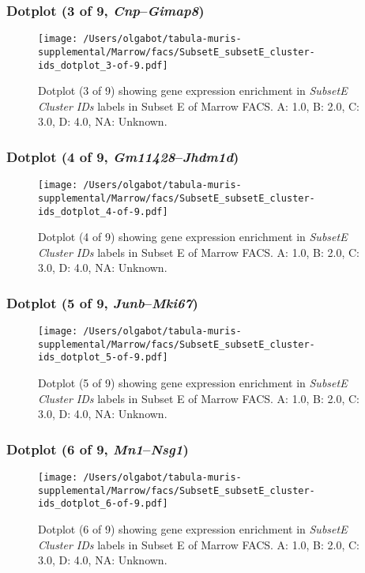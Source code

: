 \clearpage

\subsubsection{Dotplot (3 of 9, \emph{Cnp}--\emph{Gimap8})}
\begin{figure}[h]
\centering
\texttt{[image: /Users/olgabot/tabula-muris-supplemental/Marrow/facs/SubsetE\_subsetE\_cluster-ids\_dotplot\_3-of-9.pdf]}

\caption{ Dotplot (3 of 9)  showing gene expression enrichment in \emph{SubsetE Cluster IDs} labels in Subset E of Marrow FACS. A: 1.0, B: 2.0, C: 3.0, D: 4.0, NA: Unknown.}
\end{figure}


\clearpage

\subsubsection{Dotplot (4 of 9, \emph{Gm11428}--\emph{Jhdm1d})}
\begin{figure}[h]
\centering
\texttt{[image: /Users/olgabot/tabula-muris-supplemental/Marrow/facs/SubsetE\_subsetE\_cluster-ids\_dotplot\_4-of-9.pdf]}

\caption{ Dotplot (4 of 9)  showing gene expression enrichment in \emph{SubsetE Cluster IDs} labels in Subset E of Marrow FACS. A: 1.0, B: 2.0, C: 3.0, D: 4.0, NA: Unknown.}
\end{figure}


\clearpage

\subsubsection{Dotplot (5 of 9, \emph{Junb}--\emph{Mki67})}
\begin{figure}[h]
\centering
\texttt{[image: /Users/olgabot/tabula-muris-supplemental/Marrow/facs/SubsetE\_subsetE\_cluster-ids\_dotplot\_5-of-9.pdf]}

\caption{ Dotplot (5 of 9)  showing gene expression enrichment in \emph{SubsetE Cluster IDs} labels in Subset E of Marrow FACS. A: 1.0, B: 2.0, C: 3.0, D: 4.0, NA: Unknown.}
\end{figure}


\clearpage

\subsubsection{Dotplot (6 of 9, \emph{Mn1}--\emph{Nsg1})}
\begin{figure}[h]
\centering
\texttt{[image: /Users/olgabot/tabula-muris-supplemental/Marrow/facs/SubsetE\_subsetE\_cluster-ids\_dotplot\_6-of-9.pdf]}

\caption{ Dotplot (6 of 9)  showing gene expression enrichment in \emph{SubsetE Cluster IDs} labels in Subset E of Marrow FACS. A: 1.0, B: 2.0, C: 3.0, D: 4.0, NA: Unknown.}
\end{figure}


